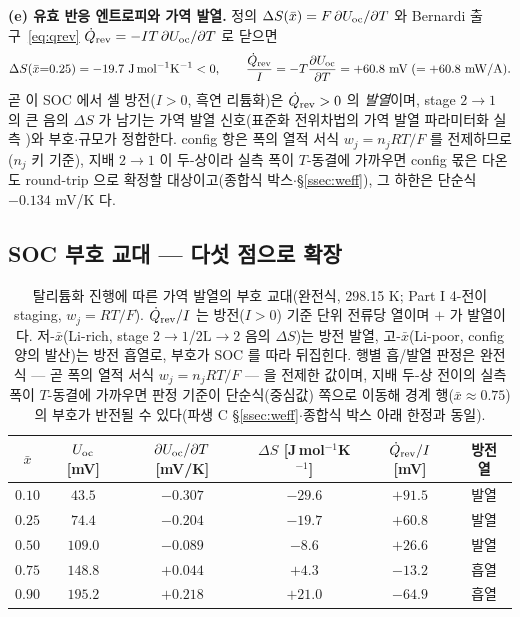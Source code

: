 \textbf{(e) 유효 반응 엔트로피와 가역 발열.} 정의 $\Delta S(\bar x)=F\,\partial U_{\mathrm{oc}}/\partial T$ 와 Bernardi
출구~\eqref{eq:qrev} $\dot Q_{\mathrm{rev}}=-IT\,\partial U_{\mathrm{oc}}/\partial T$ 로 닫으면
\begin{equation*}
\Delta S(\bar x{=}0.25)=-19.7\ \mathrm{J\,mol^{-1}K^{-1}}<0,
\qquad
\frac{\dot Q_\rev}{I}=-T\frac{\partial U_\oc}{\partial T}=+60.8\ \mathrm{mV}\;(=+60.8\ \mathrm{mW/A}).
\end{equation*}
곧 이 SOC 에서 셀 방전($I>0$, 흑연 리튬화)은 $\dot Q_{\mathrm{rev}}>0$ 의 \emph{발열}이며, stage $2\!\to\!1$ 의 큰 음의
$\Delta S$ 가 남기는 가역 발열 신호(표준화 전위차법의 가역 발열 파라미터화 실측 \cite{standardised2024})와 부호$\cdot$규모가 정합한다.
config 항은 폭의 열적 서식 $w_j{=}n_jRT/F$ 를 전제하므로($n_j$ 키 기준), 지배 $2\!\to\!1$ 이 두-상이라 실측
폭이 $T$-동결에 가까우면 config 몫은 다온도 round-trip 으로 확정할 대상이고(종합식 박스$\cdot$\S\ref{ssec:weff}),
그 하한은 단순식 $-0.134$ mV/K 다.

\subsection{SOC 부호 교대 --- 다섯 점으로 확장}\label{ssec:qrevtab}
\begin{table}[t]
\centering\small
\renewcommand{\arraystretch}{1.25}
\caption{탈리튬화 진행에 따른 가역 발열의 부호 교대(완전식, 298.15 K; Part I 4-전이 staging, $w_j{=}RT/F$).
$\dot Q_{\mathrm{rev}}/I$ 는 방전($I>0$) 기준 단위 전류당 열이며 $+$ 가 발열이다. 저-$\bar x$(Li-rich, stage
$2\!\to\!1$/$2\mathrm L\!\to\!2$ 음의 $\Delta S$)는 방전 발열, 고-$\bar x$(Li-poor, config 양의 발산)는 방전
흡열로, 부호가 SOC 를 따라 뒤집힌다. 행별 흡/발열 판정은 완전식 --- 곧 폭의 열적 서식
$w_j{=}n_jRT/F$ --- 을 전제한 값이며, 지배 두-상 전이의 실측 폭이 $T$-동결에 가까우면 판정 기준이
단순식(중심값) 쪽으로 이동해 경계 행($\bar x{\approx}0.75$)의 부호가 반전될 수 있다(파생 C
\S\ref{ssec:weff}$\cdot$종합식 박스 아래 한정과 동일).}
\label{tab:qrev}
\begin{tabular}{cccccc}
\toprule
$\bar x$ & $U_{\mathrm{oc}}$ [mV] & $\partial U_{\mathrm{oc}}/\partial T$ [mV/K] & $\Delta S$ [J\,mol$^{-1}$K$^{-1}$] & $\dot Q_{\mathrm{rev}}/I$ [mV] & 방전 열 \\
\midrule
$0.10$ & $43.5$  & $-0.307$ & $-29.6$ & $+91.5$ & 발열 \\
$0.25$ & $74.4$  & $-0.204$ & $-19.7$ & $+60.8$ & 발열 \\
$0.50$ & $109.0$ & $-0.089$ & $-8.6$  & $+26.6$ & 발열 \\
$0.75$ & $148.8$ & $+0.044$ & $+4.3$  & $-13.2$ & 흡열 \\
$0.90$ & $195.2$ & $+0.218$ & $+21.0$ & $-64.9$ & 흡열 \\
\bottomrule
\end{tabular}
\end{table}

